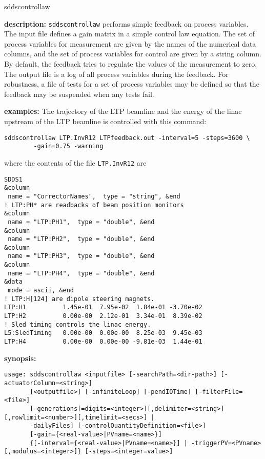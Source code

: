 \begin{sddsprog}{sddscontrollaw}
\item \textbf{description:}
\verb+sddscontrollaw+ performs simple feedback on process variables.
The input file defines a gain matrix in a simple control law equation. The set of process variables for
measurement are given by the names of the numerical data columns, and the set
of process variables for control are given by a string column. By default,
the feedback tries to regulate the values of the measurement to zero.
The output file is a log of all process variables during the feedback.
For robustness, a file of tests for a set of process variables may be defined 
so that the feedback may be suspended when any tests fail.

\item \textbf{examples:} 
% 
The trajectory of the LTP beamline and the energy of the linac upstream of the LTP
beamline is controlled with this command:
\begin{verbatim}
sddscontrollaw LTP.InvR12 LTPfeedback.out -interval=5 -steps=3600 \
        -gain=0.75 -warning
\end{verbatim}
where the contents of the file \verb+LTP.InvR12+ are
\begin{verbatim}
SDDS1
&column
 name = "CorrectorNames",  type = "string", &end
! LTP:PH* are readbacks of beam position monitors
&column
 name = "LTP:PH1",  type = "double", &end
&column             
 name = "LTP:PH2",  type = "double", &end
&column             
 name = "LTP:PH3",  type = "double", &end
&column             
 name = "LTP:PH4",  type = "double", &end
&data
 mode = ascii, &end
! LTP:H[124] are dipole steering magnets.
LTP:H1          1.45e-01  7.95e-02  1.84e-01 -3.70e-02 
LTP:H2          0.00e-00  2.12e-01  3.34e-01  8.39e-02 
! Sled timing controls the linac energy.
L5:SledTiming   0.00e-00  0.00e-00  8.25e-03  9.45e-03 
LTP:H4          0.00e-00  0.00e-00 -9.81e-03  1.44e-01 
\end{verbatim}
\item \textbf{synopsis:} 
\begin{verbatim}
usage: sddscontrollaw <inputfile> [-searchPath=<dir-path>] [-actuatorColumn=<string>]
       [<outputfile>] [-infiniteLoop] [-pendIOTime] [-filterFile=<file>]
       [-generations[=digits=<integer>][,delimiter=<string>][,rowlimit=<number>][,timelimit=<secs>] |
       -dailyFiles] [-controlQuantityDefinition=<file>]
       [-gain={<real-value>|PVname=<name>}]
       {[-interval={<real-value>|PVname=<name>}] | -triggerPV=<PVname>[,modulus=<integer>]} [-steps=<integer=value>]

\end{verbatim}
\end{sddsprog}
